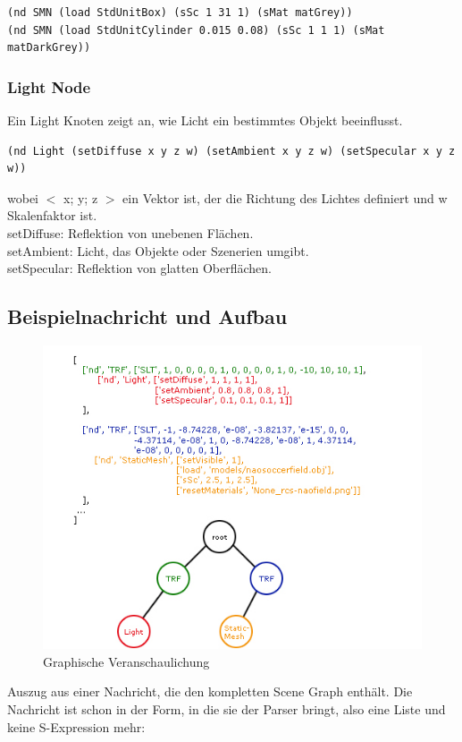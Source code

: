 \begin{verbatim}(nd SMN (load StdUnitBox) (sSc 1 31 1) (sMat matGrey))
(nd SMN (load StdUnitCylinder 0.015 0.08) (sSc 1 1 1) (sMat matDarkGrey))
\end{verbatim}
\subsubsection*{Light Node}
Ein Light Knoten zeigt an, wie Licht ein bestimmtes Objekt beeinflusst.

\begin{verbatim}(nd Light (setDiffuse x y z w) (setAmbient x y z w) (setSpecular x y z w))
\end{verbatim}
wobei $<$ x; y; z $>$ ein Vektor ist, der die Richtung des Lichtes definiert und w Skalenfaktor ist.\\
setDiffuse: Reflektion von unebenen Flächen.\\
setAmbient: Licht, das Objekte oder Szenerien umgibt.\\
setSpecular: Reflektion von glatten Oberflächen.

\subsection*{Beispielnachricht und Aufbau}
\begin{figure}[h]
\begin{center}
\includegraphics[scale=0.6]{Scene}
\end{center}
\caption{Graphische Veranschaulichung}
\end{figure}
Auszug aus einer Nachricht, die den kompletten Scene Graph enthält. 
Die Nachricht ist schon in der Form, in die sie der Parser bringt, also 
eine Liste und keine S-Expression mehr:

